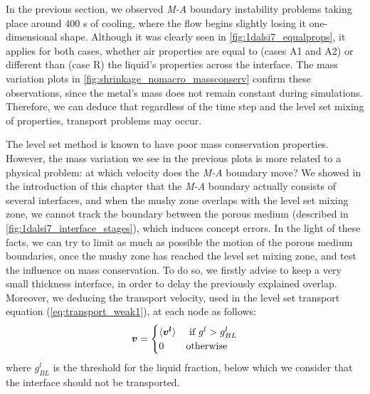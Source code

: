In the previous section, we observed \emph{M-A} boundary instability problems taking place around 400 s of cooling, where the flow begins slightly losing it one-dimensional
shape. Although it was clearly seen in \cref{fig:1dalsi7_equalprops}, it applies
for both cases, whether air properties are equal to (cases A1 and A2) or different than (case R) the liquid's properties across the interface. 
The mass variation plots in \cref{fig:shrinkage_nomacro_massconserv} confirm these observations, since the metal's mass does not remain 
constant during simulations.
Therefore, we can deduce that regardless of the time step and the level set mixing of properties, 
transport problems may occur. 

The level set method is known to have poor mass conservation properties. However, the mass variation
we see in the previous plots is more related to a physical problem: at which velocity does the \emph{M-A} boundary move?
We showed in the introduction of this chapter that the \emph{M-A} boundary actually consists of several interfaces, 
and when the mushy zone overlaps with the level set mixing zone, we cannot track the boundary between the porous medium 
(described in \cref{fig:1dalsi7_interface_stages}), which induces concept errors.
In the light of these facts, we can try to limit as much as possible the motion of the porous medium boundaries, once the mushy zone has reached the level set mixing zone,
and test the influence on mass conservation.
To do so, we firstly advise to keep a very small thickness interface, in order to delay the previously explained overlap. Moreover, we deducing the 
transport velocity, used in the level set transport equation (\cref{eq:transport_weak1}), at each node as follows:
\begin{align}
\label{eq:}
\boldsymbol{v} =
\begin{cases}
  \langle \boldsymbol{v^l} \rangle		& \text{ if } g^l > g_{BL}^l \\
  0 		& \text{otherwise}
\end{cases}
\end{align}
where $g_{BL}^l$ is the threshold for the liquid fraction, below which we consider that the interface should not be transported.

